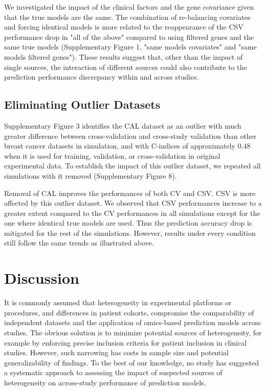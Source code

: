 \documentclass{bioinfo}
\begin{document}
	We investigated the impact of the clinical factors and the gene covariance given that
	the true models are the same. The combination of re-balancing 
	covariates and forcing identical models is more related to the reappearance of 
	the CSV performance drop in "all of the above" compared to using filtered genes 
	and the same true models (Supplementary Figure 1, "same models covariates" 
	and "same models filtered genes"). These results suggest that,
	other than the impact of single sources,
	the interaction of different sources could also contribute to the prediction performance 
	discrepancy within and across studies.
	
	
	

  \subsection{Eliminating Outlier Datasets}
  Supplementary Figure 3 identifies the CAL dataset as an outlier with
  much greater difference between cross-validation and cross-study
  validation than other breast cancer datasets in simulation, and with C-indices of
  approximately 0.48 when it is used for training, validation, or
  cross-validation in original experimental data.  To establish the
  impact of this outlier dataset, we repeated all simulations with it
  removed (Supplementary Figure 8). %

  Removal of CAL improves the performances of both CV and CSV. CSV is more affected by this outlier dataset. We observed that CSV performances increase to a greater extent compared to the CV performances in all simulations except for the one where identical true models are used. Thus the
  prediction accuracy drop is mitigated for the rest of the simulations. However, results under 
  every condition still follow the same trends as illustrated above.
  
\section{Discussion}

It is commonly assumed that heterogeneity in experimental platforms or
procedures, and differences in patient cohorts, compromise the
comparability of independent datasets and the application of
omics-based prediction models across studies.  The obvious solution is
to minimize potential sources of heterogeneity, for example by
enforcing precise inclusion criteria for patient inclusion in clinical
studies.  However, such narrowing has costs in sample size and
potential generalizability of findings.  To the best of our knowledge,
no study has suggested a systematic approach to assessing the impact
of suspected sources of heterogeneity on across-study performance of
prediction models.
\end{document}
